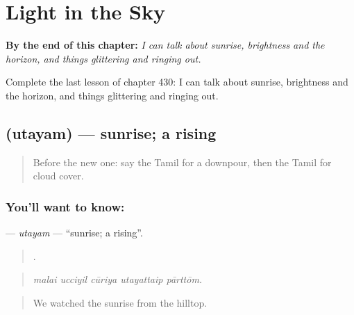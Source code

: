 
\chapter{Light in the Sky}
\label{ch:ta-light-in-the-sky}

\begin{chapteropening}
\textbf{By the end of this chapter:} \emph{I can talk about sunrise, brightness and the horizon, and things glittering and ringing out.}

Complete the last lesson of chapter 430: I can talk about sunrise, brightness and the horizon, and things glittering and ringing out.
\end{chapteropening}

\section[\texorpdfstring{\ta{உதயம்} (utayam)}{உதயம் (utayam)}]{ (utayam) — sunrise; a rising}

\label{lesson:TA-C430-utayam}



\begin{quote}
Before the new one: say the Tamil for a downpour, then the Tamil for cloud cover.
\end{quote}

\subsection*{You'll want to know: }
\textbf{} — \emph{utayam} — \textquotedblleft{}sunrise; a rising\textquotedblright{}.

\begin{quote}
    .
\end{quote}

\begin{quote}
\emph{malai ucciyil cūriya utayattaip pārttōm.}
\end{quote}

\begin{quote}
We watched the sunrise from the hilltop.
\end{quote}

